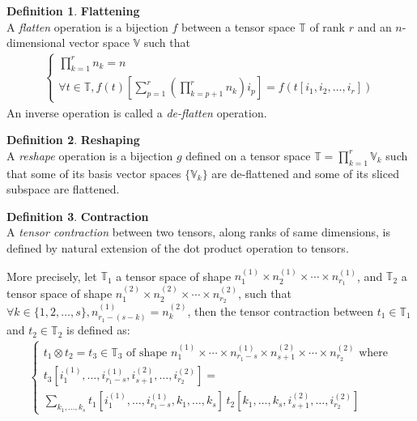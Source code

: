 \documentclass{article}
\theoremstyle{definition}
\newtheorem{definition}{Definition}[section]
\newcommand{\tspace}{\mathbb{T}}
\newcommand{\vecspace}{\mathbb{V}}
\begin{document}
\begin{definition}\textbf{Flattening}\\
A \emph{flatten} operation is a bijection $f$ between a tensor space $\tspace$ of rank $r$ and an $n$-dimensional vector space $\vecspace$ such that
\begin{gather*}
\left\{
  \begin{array}{l}
  \displaystyle \prod_{k=1}^r n_k = n \\
  \forall t \in \tspace, f(t)[\displaystyle \sum_{p=1}^r \left( \prod_{k=p+1}^r n_k \right) i_p ] = f(t[i_1, i_2, \ldots, i_r])
  \end{array}
\right.
\end{gather*}
An inverse operation is called a \emph{de-flatten} operation.
\end{definition}

\begin{definition}\textbf{Reshaping}\\
A \emph{reshape} operation is a bijection $g$ defined on a tensor space $\tspace = \displaystyle \prod_{k=1}^r \vecspace_k$ such that some of its basis vector spaces $\{\vecspace_k\}$ are de-flattened and some of its sliced subspace are flattened.
\end{definition}

\begin{definition}\textbf{Contraction}\\
A \emph{tensor contraction} between two tensors, along ranks of same dimensions, is defined by natural extension of the dot product operation to tensors.

More precisely, let $\tspace_1$ a tensor space of shape $n_1^{(1)} \times n_2^{(1)} \times \cdots \times n_{r_1}^{(1)}$, and $\tspace_2$ a tensor space of shape $n_1^{(2)} \times n_2^{(2)} \times \cdots \times n_{r_2}^{(2)}$, such that $\forall k \in \{1, 2, \ldots, s\}, n_{r_1-(s-k)}^{(1)} = n_k^{(2)}$, then the tensor contraction between $t_1 \in \tspace_1$ and $t_2 \in \tspace_2$ is defined as:
\begin{gather*}
\left\{
  \begin{array}{l}
    t_1 \otimes t_2 = t_3 \in \tspace_3 \text{ of shape } n_1^{(1)} \times \cdots \times n_{r_1-s}^{(1)} \times n_{s+1}^{(2)} \times \cdots \times n_{r_2}^{(2)}
    \text{ where} \\
    t_3[i_1^{(1)}, \ldots, i_{r_1-s}^{(1)}, i_{s+1}^{(2)}, \ldots, i_{r_2}^{(2)}] = \\
    \displaystyle \sum_{k_1, \ldots, k_s}
    t_1[i_1^{(1)}, \ldots, i_{r_1-s}^{(1)}, k_1, \ldots, k_s] \hspace{2pt}
    t_2[k_1, \ldots, k_s, i_{s+1}^{(2)}, \ldots, i_{r_2}^{(2)}]
  \end{array}
\right.
\end{gather*}
\end{definition}
\end{document}
